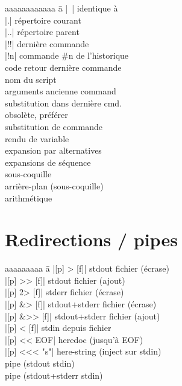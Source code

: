 \documentclass{article}
\begin{document}
\begin{multicols}{4}
    \begin{tabbing}
        aaaaaaaaaaaa \= a \kill
        \code|~| \> identique à  \\
        \code|.| \> répertoire courant \\
        \code|..| \> répertoire parent \\
        \code|!!| \> dernière commande \\
        \code|!n| \> commande \#n de l'historique \\
         \> code retour dernière commande \\
         \> nom du script \\
        \code{!*} \> arguments ancienne command \\
         \> substitution dans dernière cmd. \\
         \> obsolète, préférer  \\
         \> substitution de commande \\
         \> rendu de variable \\
         \> expansion par alternatives \\
         \> expansions de séquence \\
         \> sous-coquille \\
         \> arrière-plan (sous-coquille) \\
         \> arithmétique
    \end{tabbing}

    \section*{Redirections / pipes}
    \begin{tabbing}
        aaaaaaaaa \= a \kill
        \code|[p] > [f]| \> stdout \textrightarrow{} fichier (écrase) \\
        \code|[p] >> [f]| \> stdout \textrightarrow{} fichier (ajout) \\
        \code|[p] 2> [f]| \> stderr \textrightarrow{} fichier (écrase) \\
        \code|[p] &> [f]| \> stdout+stderr \textrightarrow{} fichier (écrase) \\
        \code|[p] &>> [f]| \> stdout+stderr \textrightarrow{} fichier (ajout) \\
        \code|[p] < [f]| \> stdin depuis fichier \\
        \code|[p] << EOF| \> heredoc (jusqu'à EOF) \\
        \code|[p] <<< "s"| \> here-string (inject sur stdin) \\
        \code{[p] | [p]} \> pipe (stdout \textrightarrow{} stdin) \\
        \code{[p] |& [p]} \> pipe (stdout+stderr \textrightarrow{} stdin)
    \end{tabbing}


\end{multicols}
\end{document}
